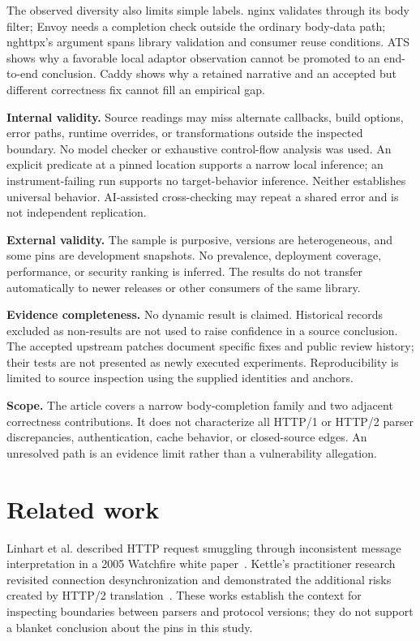 \documentclass[11pt,letterpaper]{article}
\begin{document}
The observed diversity also limits simple labels. nginx validates through its body filter; Envoy needs a completion check outside the ordinary body-data path; nghttpx's argument spans library validation and consumer reuse conditions. ATS shows why a favorable local adaptor observation cannot be promoted to an end-to-end conclusion. Caddy shows why a retained narrative and an accepted but different correctness fix cannot fill an empirical gap.

\textbf{Internal validity.} Source readings may miss alternate callbacks, build options, error paths, runtime overrides, or transformations outside the inspected boundary. No model checker or exhaustive control-flow analysis was used. An explicit predicate at a pinned location supports a narrow local inference; an instrument-failing run supports no target-behavior inference. Neither establishes universal behavior. AI-assisted cross-checking may repeat a shared error and is not independent replication.

\textbf{External validity.} The sample is purposive, versions are heterogeneous, and some pins are development snapshots. No prevalence, deployment coverage, performance, or security ranking is inferred. The results do not transfer automatically to newer releases or other consumers of the same library.

\textbf{Evidence completeness.} No dynamic result is claimed. Historical records excluded as non-results are not used to raise confidence in a source conclusion. The accepted upstream patches document specific fixes and public review history; their tests are not presented as newly executed experiments. Reproducibility is limited to source inspection using the supplied identities and anchors.

\textbf{Scope.} The article covers a narrow body-completion family and two adjacent correctness contributions. It does not characterize all HTTP/1 or HTTP/2 parser discrepancies, authentication, cache behavior, or closed-source edges. An unresolved path is an evidence limit rather than a vulnerability allegation.

\section{Related work}
Linhart et al. described HTTP request smuggling through inconsistent message interpretation in a 2005 Watchfire white paper~\cite{linhart}. Kettle's practitioner research revisited connection desynchronization and demonstrated the additional risks created by HTTP/2 translation~\cite{kettle2019,kettle2021}. These works establish the context for inspecting boundaries between parsers and protocol versions; they do not support a blanket conclusion about the pins in this study.
\end{document}

